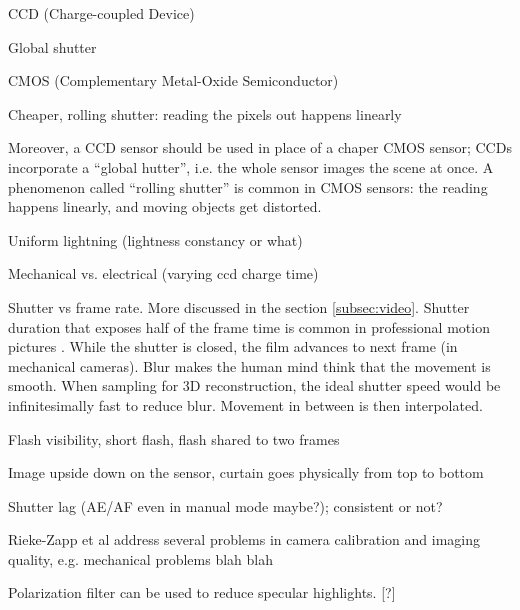 CCD (Charge-coupled Device)

Global shutter

CMOS (Complementary Metal-Oxide Semiconductor)

Cheaper, rolling shutter: reading the pixels out happens linearly

Moreover, a CCD sensor should be used in place of a chaper CMOS sensor; CCDs incorporate a ``global hutter'', i.e. the whole sensor images the scene at once. A phenomenon called ``rolling shutter'' is common in CMOS sensors: the reading happens linearly, and moving objects get distorted.

Uniform lightning (lightness constancy or what)

Mechanical vs. electrical (varying ccd charge time)

Shutter vs frame rate. More discussed in the section \ref{subsec:video}. Shutter duration that exposes half of the frame time is common in professional motion pictures \cite{wilson2004anton}. While the shutter is closed, the film advances to next frame (in mechanical cameras). Blur makes the human mind think that the movement is smooth. When sampling for 3D reconstruction, the ideal shutter speed would be infinitesimally fast to reduce blur. Movement in between is then interpolated.

Flash visibility, short flash, flash shared to two frames

Image upside down on the sensor, curtain goes physically from top to bottom

Shutter lag (AE/AF even in manual mode maybe?); consistent or not?

Rieke-Zapp et al \cite{rieke2009evaluation} address several problems in camera calibration and imaging quality, e.g. mechanical problems blah blah

Polarization filter can be used to reduce specular highlights. [?] 

